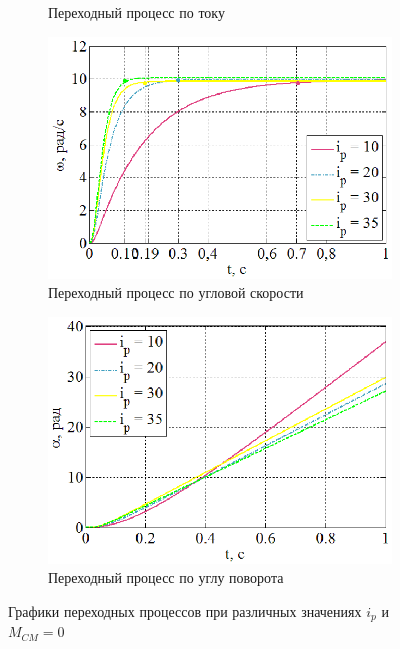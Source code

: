 \documentclass[a4paper,12pt]{article} %
\begin{document}
\begin{figure}[H]
\begin{subfigure}[b]{0.48\textwidth}
		\caption{Переходный процесс по току}
	\end{subfigure}
	\begin{subfigure}[b]{0.48\textwidth}
		\includegraphics[width = \textwidth]{scheme/W3}
		\caption{Переходный процесс по угловой скорости}
	\end{subfigure}
	\hfill
	\begin{subfigure}[b]{0.48\textwidth}
		\includegraphics[width = \textwidth]{scheme/A3}
		\caption{Переходный процесс по углу поворота}
	\end{subfigure}
	\caption{Графики переходных процессов при различных значениях $i_p$ и $M_{CM}=0$}
	\label{UIwa00}
\end{figure}
\end{document}
